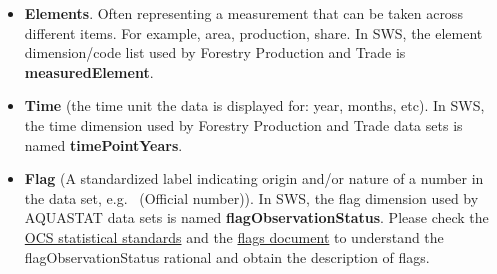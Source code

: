 \documentclass[
]{book}
\begin{document}
\begin{itemize}
\item
  \textbf{Elements}. Often representing a measurement that can be taken across different items. For example, area, production, share. In SWS, the element dimension/code list used by Forestry Production and Trade is \textbf{measuredElement}.
\item
  \textbf{Time} (the time unit the data is displayed for: year, months, etc). In SWS, the time dimension used by Forestry Production and Trade data sets is named \textbf{timePointYears}.
\item
  \textbf{Flag} (A standardized label indicating origin and/or nature of a number in the data set, e.g.~ (Official number)). In SWS, the flag dimension used by AQUASTAT data sets is named \textbf{flagObservationStatus}. Please check the \href{http://intranet.fao.org/statistics_coordination_portal/standards_for_quality_compliance/}{OCS statistical standards} and the \href{http://intranet.fao.org/fileadmin/user_upload/scp/Standards_for_quality_compliance/SSS_Observation_Status_Codes__Flags__endorsed__December_2016_.pdf}{flags document} to understand the flagObservationStatus rational and obtain the description of flags.
\end{itemize}
\end{document}
